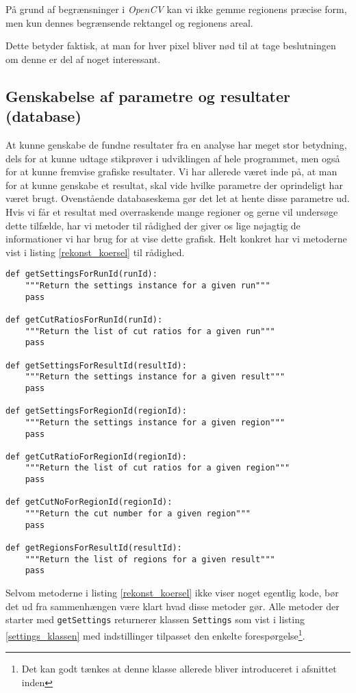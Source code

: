{På grund af begrænsninger i \emph{OpenCV} kan vi ikke gemme regionens
præcise form, men kun dennes begrænsende rektangel og regionens areal.

Dette betyder faktisk, at man for hver pixel bliver nød
til at tage beslutningen om denne er del af noget interessant.

\subsection{Genskabelse af parametre og resultater (database)}
At kunne genskabe de fundne resultater fra en analyse har meget stor
betydning, dels for at kunne udtage stikprøver i udviklingen af hele
programmet, men også for at kunne fremvise grafiske resultater. Vi har
allerede været inde på, at man for at kunne genskabe et resultat, skal
vide hvilke parametre der oprindeligt har været brugt. Ovenstående
databaseskema gør det let at hente disse parametre ud. Hvis vi får et
resultat med overraskende mange regioner og gerne vil undersøge dette
tilfælde, har vi metoder til rådighed der giver os lige nøjagtig de
informationer vi har brug for at vise dette grafisk. Helt konkret har vi
metoderne vist i listing \ref{rekonst_koersel} til rådighed.

\vspace{0.5cm}
\begin{lstlisting}[caption={Metoder til rekonstruktion af kørsler},captionpos=b,label={rekonst_koersel},numbers=none]
def getSettingsForRunId(runId):
    """Return the settings instance for a given run"""
    pass

def getCutRatiosForRunId(runId):
    """Return the list of cut ratios for a given run"""
    pass

def getSettingsForResultId(resultId):
    """Return the settings instance for a given result"""
    pass

def getSettingsForRegionId(regionId):
    """Return the settings instance for a given region"""
    pass

def getCutRatioForRegionId(regionId):
    """Return the list of cut ratios for a given region"""
    pass

def getCutNoForRegionId(regionId):
    """Return the cut number for a given region"""
    pass

def getRegionsForResultId(resultId):
    """Return the list of regions for a given result"""
    pass
\end{lstlisting}

Selvom metoderne i listing \ref{rekonst_koersel} ikke viser noget
egentlig kode, bør det ud fra sammenhængen være klart hvad disse metoder
gør. Alle metoder der starter med \texttt{getSettings} returnerer
klassen \texttt{Settings} som vist i listing \ref{settings_klassen} med
indstillinger tilpasset den enkelte forespørgelse\footnote{Det kan godt tænkes
at denne klasse allerede bliver introduceret i afsnittet inden}.

}
